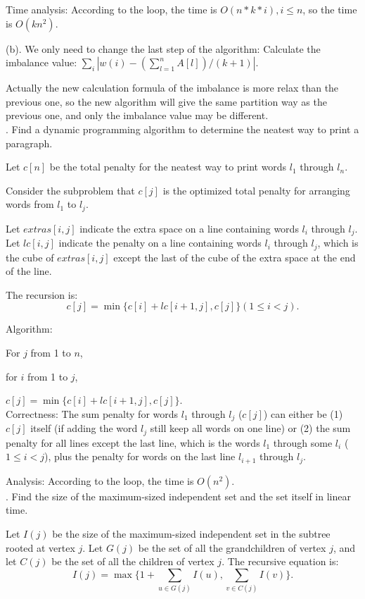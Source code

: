 \documentclass[11pt]{article} %
\begin{document}
Time analysis: According to the loop, the time is $O(n*k*i), i \leq n$, so the time is $O(kn^2)$.

(b). 
We only need to change the last step of the algorithm: Calculate the imbalance value: $\sum_i |w(i) - (\sum_{l=1}^n A[l]) / (k+1)|$.

Actually the new calculation formula of the imbalance is more relax than the previous one, so the new algorithm will give the same partition way as the previous one, and only the imbalance value may be different.\\

. Find a dynamic programming algorithm to determine the neatest way to print a paragraph.

Let $c[n]$ be the total penalty for the neatest way to print words $l_1$ through $l_n$.

Consider the subproblem that 
$c[j]$ is the optimized total penalty for arranging words from $l_1$ to $l_j$.

Let $extras[i, j]$ indicate the extra space on a line containing words $l_i$ through $l_j$.
Let $lc[i, j]$ indicate the penalty on a line containing words $l_i$ through $l_j$, which is the cube of $extras[i, j]$ except the last of the cube of the extra space at the end of the line. 

The recursion is: $$c[j] = \min \{ c[i]+ lc[i+1, j], c[j]\} (1 \leq i < j).$$

Algorithm:

For $j$ from 1 to $n$,

\quad for $i$ from 1 to $j$,

\quad \quad $c[j] = \min \{ c[i]+ lc[i+1, j], c[j]\}$.\\


Correctness: 
The sum penalty for words $l_1$ through $l_j$ ($c[j]$) can either be
(1) $c[j]$ itself (if adding the word $l_j$ still keep all words on one line)
or (2) the sum penalty for all lines except the last line, which is the words $l_1$ through some $l_i$ ($1 \leq i < j$), plus the penalty for words on the last line $l_{i+1}$ through $l_j$.

Analysis: According to the loop, the time is $O(n^2)$.\\



. Find the size of the maximum-sized independent set and the set itself in linear time.

Let $I(j)$ be the size of the maximum-sized independent set in the subtree rooted at vertex $j$. 
Let $G(j)$ be the set of all the grandchildren of vertex $j$, and let $C(j)$ be the set of all the children of vertex $j$.
The recursive equation is:
 $$I(j) = \max \{ 1 + \sum_{u \in G(j)} I(u) ,  \sum_{v \in C(j) } I(v) \}.$$
 
\end{document}
